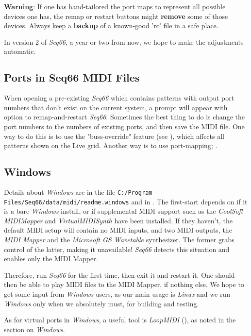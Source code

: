    \textbf{Warning}:
   If one has hand-tailored the port maps to represent all possible devices one
   has, the remap or restart buttons might \textbf{remove}
   some of those devices.
   Always keep a \textbf{backup}
   of a known-good 'rc' file in a safe place.

   In version 2 of \textsl{Seq66}, a year or two from now, we hope to make
   the adjustments automatic.

\subsection{Ports in Seq66 MIDI Files}
\label{subsec:introduction_ports}

   When opening a pre-existing \textsl{Seq66} which contains patterns with
   output port numbers that don't exist on the current system, a prompt
   will appear with option to remap-and-restart \textsl{Seq66}.
   Sometimes the best thing to do is change the
   port numbers to the numbers of existing ports, and then save the MIDI file.
   One way to do this is to use the "buss-override" feature
   (see ),
   which affects all patterns shown on the Live grid.
   Another way is to use port-mapping;
   .

\subsection{Windows}
\label{subsec:introduction_windows}


   Details about \textsl{Windows} are in the file
   \texttt{C:/Program Files/Seq66/data/midi/readme.windows}
   and in .
   The first-start depends on if it is a bare \textsl{Windows}
   install, or if supplemental MIDI support such as 
   the 
   \textsl{CoolSoft MIDIMapper} and 
   \textsl{VirtualMIDISynth} have been installed.
   If they haven't, the default MIDI setup will contain no MIDI inputs,
   and two MIDI outputs, the \textsl{MIDI Mapper} and the
   \textsl{Microsoft GS Wavetable} synthesizer.
   The former grabs control of the latter, making it unavailable!
   \textsl{Seq66} detects this situation and enables only the MIDI Mapper.

   Therefore, run \textsl{Seq66} for the first time, then exit it and
   restart it. One should then be able to play MIDI files to the MIDI Mapper,
   if nothing else.
   We hope to get some input from
   \textsl{Windows} users, as our main usage is \textsl{Linux}
   and we run \textsl{Windows} only when we absolutely must, for building
   and testing.

   As for virtual ports in \textsl{Windows}, a useful tool
   is \textsl{LoopMIDI} (\cite{loopmidi}), as noted in the section
   on \textsl{Windows}.

